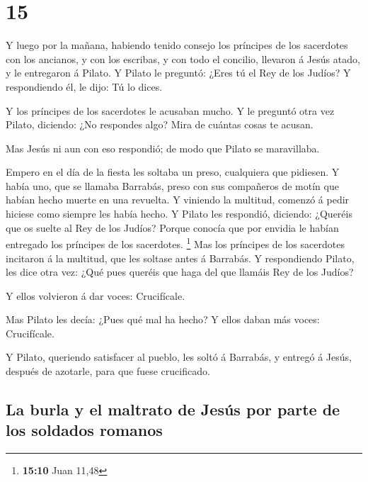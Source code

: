 \hypertarget{section-14}{%
\section{15}\label{section-14}}

 Y luego por la mañana, habiendo tenido consejo los
príncipes de los sacerdotes con los ancianos, y con los escribas, y con
todo el concilio, llevaron á Jesús atado, y le entregaron á Pilato.
 Y Pilato le preguntó: ¿Eres tú el Rey de los Judíos? Y
respondiendo él, le dijo: Tú lo dices.

 Y los príncipes de los sacerdotes le acusaban mucho.
 Y le preguntó otra vez Pilato, diciendo: ¿No respondes
algo? Mira de cuántas cosas te acusan.

 Mas Jesús ni aun con eso respondió; de modo que Pilato se
maravillaba.

 Empero en el día de la fiesta les soltaba un preso,
cualquiera que pidiesen.  Y había uno, que se llamaba
Barrabás, preso con sus compañeros de motín que habían hecho muerte en
una revuelta.  Y viniendo la multitud, comenzó á pedir
hiciese como siempre les había hecho.  Y Pilato les
respondió, diciendo: ¿Queréis que os suelte al Rey de los Judíos?
 Porque conocía que por envidia le habían entregado los
príncipes de los sacerdotes. \footnote{\textbf{15:10} Juan 11,48}
 Mas los príncipes de los sacerdotes incitaron á la
multitud, que les soltase antes á Barrabás.  Y
respondiendo Pilato, les dice otra vez: ¿Qué pues queréis que haga del
que llamáis Rey de los Judíos?

 Y ellos volvieron á dar voces: Crucifícale.

 Mas Pilato les decía: ¿Pues qué mal ha hecho? Y ellos
daban más voces: Crucifícale.

 Y Pilato, queriendo satisfacer al pueblo, les soltó á
Barrabás, y entregó á Jesús, después de azotarle, para que fuese
crucificado.

\hypertarget{la-burla-y-el-maltrato-de-jesuxfas-por-parte-de-los-soldados-romanos}{%
\subsection{La burla y el maltrato de Jesús por parte de los soldados
romanos}\label{la-burla-y-el-maltrato-de-jesuxfas-por-parte-de-los-soldados-romanos}}

